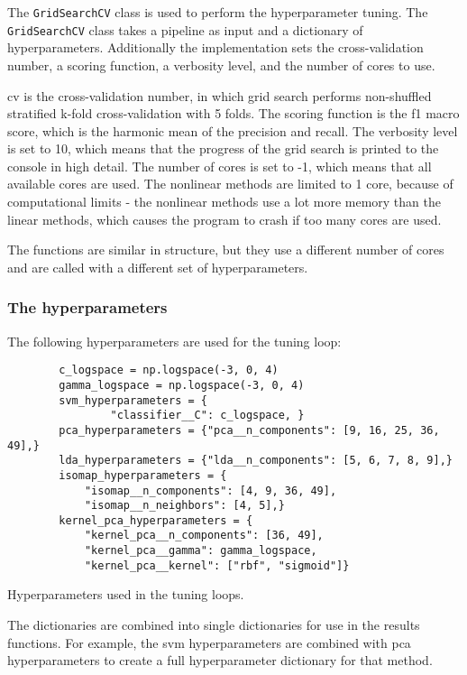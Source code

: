 The \texttt{GridSearchCV} class is used to perform the hyperparameter tuning. The \texttt{GridSearchCV} class takes a pipeline as input and a dictionary of hyperparameters. Additionally the implementation sets the cross-validation number, a scoring function, a verbosity level, and the number of cores to use.

cv is the cross-validation number, in which grid search performs non-shuffled stratified k-fold cross-validation with 5 folds. The scoring function is the f1 macro score, which is the harmonic mean of the precision and recall. The verbosity level is set to 10, which means that the progress of the grid search is printed to the console in high detail. The number of cores is set to -1, which means that all available cores are used. The nonlinear methods are limited to 1 core, because of computational limits - the nonlinear methods use a lot more memory than the linear methods, which causes the program to crash if too many cores are used.


The functions are similar in structure, but they use a different number of cores and are called with a different set of hyperparameters.

\subsubsection{The hyperparameters}\label{subsubsec:the-hyperparameters}
The following hyperparameters are used for the tuning loop:


\begin{listing}[htb!]
    \centering
    \begin{verbatim}
        c_logspace = np.logspace(-3, 0, 4)
        gamma_logspace = np.logspace(-3, 0, 4)
        svm_hyperparameters = {
                "classifier__C": c_logspace, }
        pca_hyperparameters = {"pca__n_components": [9, 16, 25, 36, 49],}
        lda_hyperparameters = {"lda__n_components": [5, 6, 7, 8, 9],}
        isomap_hyperparameters = {
            "isomap__n_components": [4, 9, 36, 49],
            "isomap__n_neighbors": [4, 5],}
        kernel_pca_hyperparameters = {
            "kernel_pca__n_components": [36, 49],
            "kernel_pca__gamma": gamma_logspace,
            "kernel_pca__kernel": ["rbf", "sigmoid"]}
    \end{verbatim}
    \caption{Hyperparameters used in the tuning loops.}
    \label{lst:hyperparameters-dictionaries}
\end{listing}


The dictionaries are combined into single dictionaries for use in the results functions. For example, the \gls{svm} hyperparameters are combined with \gls{pca} hyperparameters to create a full hyperparameter dictionary for that method.
